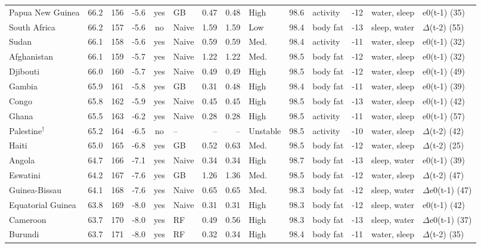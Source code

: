 {\begin{longtable}{l r r r c l r r l r l r l l}
Papua New Guinea & 66.2 & 156 & -5.6 & yes & GB & 0.47 & 0.48 & High & 98.6 & activity & -12 & water, sleep & e0(t-1) (35) \\
South Africa & 66.2 & 157 & -5.6 & no & Naive & 1.59 & 1.59 & Low & 98.4 & body fat & -13 & sleep, water & $\Delta$(t-2) (55) \\
Sudan & 66.1 & 158 & -5.6 & yes & Naive & 0.59 & 0.59 & Med. & 98.4 & activity & -11 & water, sleep & e0(t-1) (32) \\
Afghanistan & 66.1 & 159 & -5.7 & yes & Naive & 1.22 & 1.22 & Med. & 98.5 & body fat & -12 & water, sleep & e0(t-1) (32) \\
Djibouti & 66.0 & 160 & -5.7 & yes & Naive & 0.49 & 0.49 & High & 98.5 & body fat & -12 & water, sleep & e0(t-1) (49) \\
Gambia & 65.9 & 161 & -5.8 & yes & GB & 0.31 & 0.48 & High & 98.4 & body fat & -11 & water, sleep & e0(t-1) (39) \\
Congo & 65.8 & 162 & -5.9 & yes & Naive & 0.45 & 0.45 & High & 98.5 & body fat & -13 & water, sleep & e0(t-1) (42) \\
Ghana & 65.5 & 163 & -6.2 & yes & Naive & 0.28 & 0.28 & High & 98.5 & activity & -11 & water, sleep & e0(t-1) (57) \\
Palestine$^\dagger$ & 65.2 & 164 & -6.5 & no & -- & -- & -- & Unstable & 98.5 & activity & -10 & water, sleep & $\Delta$(t-2) (42) \\
Haiti & 65.0 & 165 & -6.8 & yes & GB & 0.52 & 0.63 & Med. & 98.5 & body fat & -12 & water, sleep & $\Delta$(t-2) (25) \\
Angola & 64.7 & 166 & -7.1 & yes & Naive & 0.34 & 0.34 & High & 98.7 & body fat & -13 & sleep, water & e0(t-1) (39) \\
Eswatini & 64.2 & 167 & -7.6 & yes & GB & 1.26 & 1.36 & Med. & 98.5 & body fat & -12 & water, sleep & $\Delta$(t-2) (47) \\
Guinea-Bissau & 64.1 & 168 & -7.6 & yes & Naive & 0.65 & 0.65 & Med. & 98.3 & body fat & -12 & sleep, water & $\Delta$e0(t-1) (47) \\
Equatorial Guinea & 63.8 & 169 & -8.0 & yes & Naive & 0.31 & 0.31 & High & 98.3 & body fat & -12 & sleep, water & e0(t-1) (42) \\
Cameroon & 63.7 & 170 & -8.0 & yes & RF & 0.49 & 0.56 & High & 98.3 & body fat & -13 & sleep, water & $\Delta$e0(t-1) (37) \\
Burundi & 63.7 & 171 & -8.0 & yes & RF & 0.32 & 0.34 & High & 98.4 & body fat & -11 & water, sleep & $\Delta$(t-2) (35) \\

\end{longtable}}
